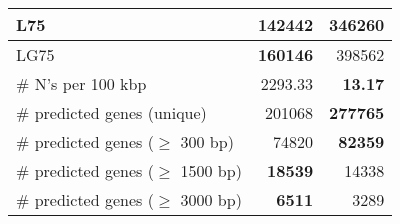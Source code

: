 \documentclass[12pt,a4paper]{article}
\begin{document}
\begin{table}[ht]
\begin{center}
\begin{tabular}{|l*{2}{|r}|}
L75 & {\bf 142442} & 346260 \\ \hline
LG75 & {\bf 160146} & 398562 \\ \hline
\# N's per 100 kbp & 2293.33 & {\bf 13.17} \\ \hline
\# predicted genes (unique) & 201068 & {\bf 277765} \\ \hline
\# predicted genes ($\geq$ 300 bp) & 74820 & {\bf 82359} \\ \hline
\# predicted genes ($\geq$ 1500 bp) & {\bf 18539} & 14338 \\ \hline
\# predicted genes ($\geq$ 3000 bp) & {\bf 6511} & 3289 \\ \hline
\end{tabular}
\end{center}
\end{table}
\end{document}
